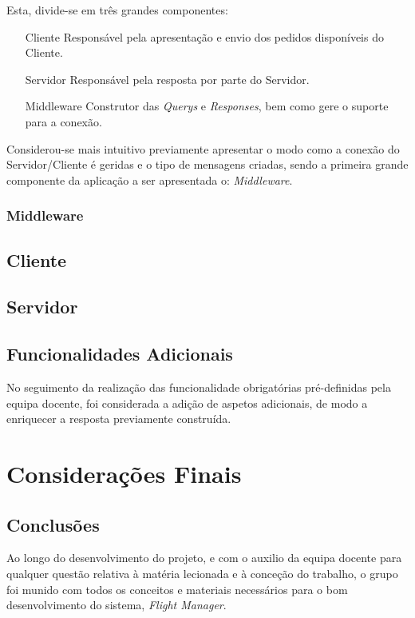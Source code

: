 \documentclass[a4paper,11pt]{scrreprt}
\begin{document}
Esta, divide-se em três grandes componentes:
\begin{itemize}
    \item[Cliente]{Responsável pela apresentação e envio dos pedidos disponíveis do Cliente.}
    \item[Servidor]{Responsável pela resposta por parte do Servidor.}
    \item[Middleware]{Construtor das \textit{Querys} e \textit{Responses}, bem como gere o suporte para a conexão.}
\end{itemize}

Considerou-se mais intuitivo previamente apresentar o modo como a conexão do Servidor/Cliente é geridas e o tipo
de mensagens criadas, sendo a primeira grande componente da aplicação a ser apresentada o: \textit{Middleware}.

\subsection{Middleware}


\section{Cliente}


\section{Servidor}


\section{Funcionalidades Adicionais}

No seguimento da realização das funcionalidade obrigatórias pré-definidas pela equipa docente, 
foi considerada a adição de aspetos adicionais, de modo a enriquecer a resposta previamente 
construída.

\chapter{Considerações Finais}
\section{Conclusões}

Ao longo do desenvolvimento do projeto, e com o auxilio da equipa docente para qualquer questão 
relativa à matéria lecionada e à conceção do trabalho, o grupo foi munido com todos os conceitos
e materiais necessários para o bom desenvolvimento do sistema, \textit{Flight Manager}.
\end{document}
